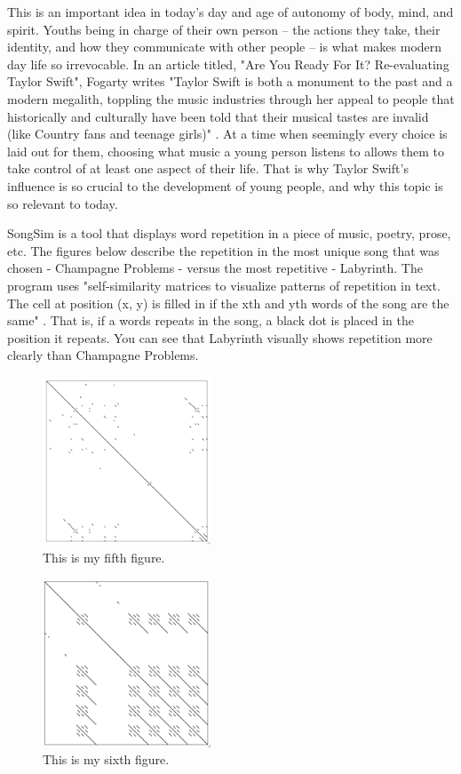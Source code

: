 \documentclass[12pt]{article}
\begin{document}
This is an important idea in today's day and age of autonomy of body, mind, and spirit. Youths being in charge of their own person -- the actions they take, their identity, and how they communicate with other people -- is what makes modern day life so irrevocable.  In an article titled, "Are You Ready For It? Re-evaluating Taylor Swift", Fogarty writes "Taylor Swift is both a monument to the past and a modern megalith, toppling the music industries through her appeal to people that historically and culturally have been told that their musical tastes are invalid (like Country fans and teenage girls)" \citep{fogarty2021you}. At a time when seemingly every choice is laid out for them, choosing what music a young person listens to allows them to take control of at least one aspect of their life. That is why Taylor Swift's influence is so crucial to the development of young people, and why this topic is so relevant to today. 

SongSim is a tool that displays word repetition in a piece of music, poetry, prose, etc. The figures below describe the repetition in the most unique song that was chosen - Champagne Problems - versus the most repetitive - Labyrinth. The program uses "self-similarity matrices to visualize patterns of repetition in text. The cell at position (x, y) is filled in if the xth and yth words of the song are the same" \citep{morris2017songsim}. That is, if a words repeats in the song, a black dot is placed in the position it repeats. You can see that Labyrinth visually shows repetition more clearly than Champagne Problems. 

	\begin{figure}[tbp]
  \centering
  \includegraphics[width=50mm]{Champagne Problems}
  \caption{This is my fifth figure.}
  \label{fig:SongSim for Champagne Problems}
\end{figure}

	\begin{figure}[tbp]
  \centering
  \includegraphics[width=50mm]{Labyrinth}
  \caption{This is my sixth figure.}
  \label{fig:SongSim for Labyrinth}
\end{figure}
\end{document}
